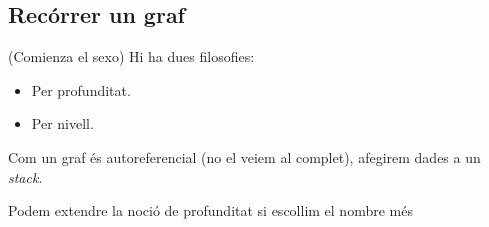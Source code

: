\documentclass[../main.tex]{subfiles}
\begin{document}
    \subsection{Recórrer un graf}
    (Comienza el sexo)
    Hi ha dues filosofies:
    \begin{itemize}
        \item Per profunditat. 
        \item Per nivell.
    \end{itemize}
    Com un graf és autoreferencial (no el veiem al complet), afegirem dades a un \textit{stack}.
    \begin{obs}
        Podem extendre la noció de profunditat si escollim el nombre més
    \end{obs}
\end{document}
